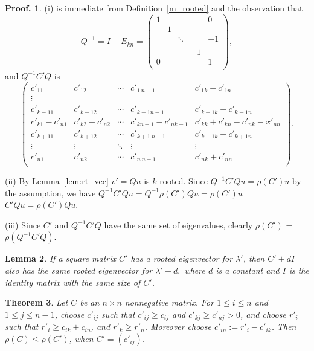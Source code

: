 \documentclass[12pt]{report}
\theoremstyle{plain}
\newtheorem{thm}{Theorem}[chapter]
\newtheorem{lem}[thm]{Lemma}
\theoremstyle{definition}
\newtheorem{pof}[thm]{Proof.}
\begin{document}
\begin{pof}
(i) is immediate from Definition~\ref{m_rooted} and the observation that
$$Q^{-1}=I-E_{kn}=\begin{pmatrix}
1 &  & & &  & 0 \\
 & 1 &  &      &  &  \\
 &  & \ddots & &  & -1 \\
 &  &        & &  &  \\
  &  & & & 1 &  \\
0 &  & & &  & 1 \\
\end{pmatrix},$$
and $Q^{-1}C'Q$ is
$$\begin{pmatrix}
c'_{11}     & c'_{12} & \cdots     & c'_{1\ n-1} & c'_{1k}+c'_{1n} \\
\vdots \\
c'_{k-11}     & c'_{k-1 2}           & \cdots     & c'_{k-1 n-1} & c'_{k-1k}+c'_{k-1n} \\
c'_{k1}-c'_{n1} & c'_{k2}-c'_{n2} &\cdots      &c'_{kn-1}-c'_{nk-1}& c'_{kk}+c'_{kn}-c'_{nk}-x'_{nn}\\
c'_{k+11}     & c'_{k+12}           & \cdots     & c'_{k+1\ n-1} & c'_{k+1k}+c'_{k+1n} \\
\vdots              & \vdots & \ddots              & \vdots & \vdots \\
c'_{n1}             & c'_{n2} & \cdots             & c'_{n\ n-1} & c'_{nk}+c'_{nn} \\
\end{pmatrix}.
$$



(ii)
By Lemma~\ref{lem:rt_vec} $v'=Qu$ is $k$-rooted.
Since $Q^{-1}C'Qu=\rho(C')u$ by the assumption, we have
$Q^{-1} C' Q u  = Q^{-1} \rho(C') Qu  =\rho(C')u$  \\
$C'Qu=\rho(C')Qu$.



(iii)
Since $C'$ and $Q^{-1}C'Q$ have the same set of eigenvalues, clearly $\rho(C')$ = $\rho(Q^{-1}C'Q)$.

\end{pof}


\begin{lem}\label{l_diag}
If a square matrix $C'$ has a rooted eigenvector for $\lambda'$, then $C'+dI$ also has
the same rooted eigenvector for $\lambda'+d,$ where $d$ is a constant and $I$ is the identity matrix with the same size of $C'$.
\end{lem}

\begin{thm}
Let $C$ be an $n\times n$ nonnegative matrix. For $1\leq i \leq n$ and $1\leq j\leq n-1$, choose $c'_{ij}$
such that $c'_{ij}\geq c_{ij}$ and $c'_{kj}\geq c'_{nj}>0$, and choose $r'_i$ such that $r'_i\geq c_{ik}+c_{in}$, and
$r'_k \geq r'_n$. Moreover choose $c'_{in}:=r'_i-c'_{ik}$. Then $\rho(C)\leq \rho(C')$, when $C'=(c'_{ij})$.
\end{thm}
\end{document}
